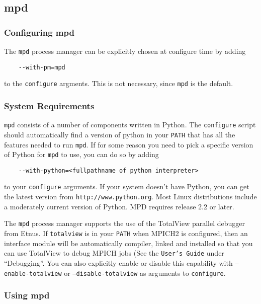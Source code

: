 \documentclass[dvipdfm,11pt]{article}
\begin{document}
\subsection{mpd}
\label{sec:mpd}

\subsubsection{Configuring mpd}
\label{sec:configuring-mpd}

The \texttt{mpd} process manager can be explicitly chosen at configure
time by adding
\begin{verbatim}
    --with-pm=mpd
\end{verbatim}
to the \texttt{configure} argments.  This is not necessary, since
\texttt{mpd} is the default.


\subsubsection{System Requirements}
\label{sec:mpd-requirements}

\texttt{mpd} consists of a number of components written in Python.
The \texttt{configure} script should automatically find a version of
python in your \texttt{PATH} that has all the features needed to run
\texttt{mpd}.  If for some reason you need to pick a specific version of
Python for \texttt{mpd} to use, you can do so by adding
\begin{verbatim}
    --with-python=<fullpathname of python interpreter>
\end{verbatim}
to your \texttt{configure} arguments.  If your system doesn't have Python,
you can get the latest version from \texttt{http://www.python.org}.
Most Linux distributions include a moderately current version of Python.
MPD requires release 2.2 or later.

The \texttt{mpd} process manager supports the use of the TotalView
parallel debugger from Etnus.  If \texttt{totalview} is in your
\texttt{PATH} when MPICH2 is configured, then an interface module will
be automatically compiler, linked and installed so that you can use
TotalView to debug MPICH jobs (See the \texttt{User's Guide} under
``Debugging''.  You can also explicitly enable or disable this
capability with \texttt{--enable-totalview} or
\texttt{--disable-totalview} as arguments to \texttt{configure}.

\subsubsection{Using mpd}
\label{sec:using-mpd}
\end{document}
